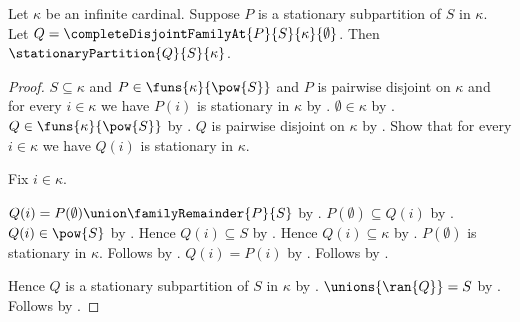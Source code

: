 \begin{theorem}\label{stationary_subpartition_completion}
    Let $\kappa$ be an infinite cardinal.
    Suppose $P$ is a stationary subpartition of $S$ in $\kappa$.
    Let $Q=\completeDisjointFamilyAt{P}{S}{\kappa}{\emptyset}$.
    Then $\stationaryPartition{Q}{S}{\kappa}$.
\end{theorem}
\begin{proof}
    $S\subseteq\kappa$ and $P\in\funs{\kappa}{\pow{S}}$ and
        $P$ is pairwise disjoint on $\kappa$ and
        for every $i\in\kappa$ we have $P(i)$ is stationary in $\kappa$
        by .
    $\emptyset\in\kappa$ by .
    $Q\in\funs{\kappa}{\pow{S}}$
        by .
    $Q$ is pairwise disjoint on $\kappa$
        by .
    Show that for every $i\in\kappa$ we have
        $Q(i)$ is stationary in $\kappa$.
    \begin{subproof}
        Fix $i\in\kappa$.
        \begin{byCase}
            $Q(i)=P(\emptyset)\union\familyRemainder{P}{S}$
                by .
            $P(\emptyset)\subseteq Q(i)$ by .
            $Q(i)\in\pow{S}$ by .
            Hence $Q(i)\subseteq S$ by .
            Hence $Q(i)\subseteq\kappa$ by .
            $P(\emptyset)$ is stationary in $\kappa$.
            Follows by .
            $Q(i)=P(i)$ by .
            Follows by \auto.
        \end{byCase}
    \end{subproof}
    Hence $Q$ is a stationary subpartition of $S$ in $\kappa$
        by .
    $\unions{\ran{Q}}=S$ by .
    Follows by .
\end{proof}
